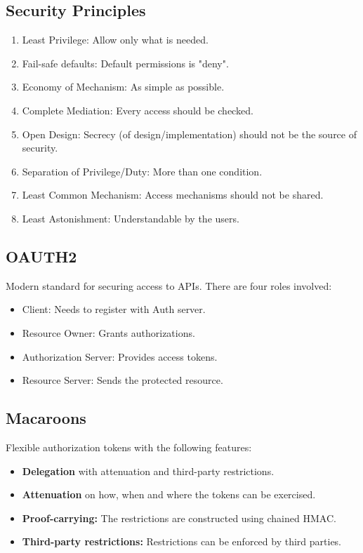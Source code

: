 \documentclass{article}
\begin{document}
\subsection{Security Principles}
\begin{enumerate}
    \item Least Privilege: Allow only what is needed.
    \item Fail-safe defaults: Default permissions is "deny".
    \item Economy of Mechanism: As simple as possible.
    \item Complete Mediation: Every access should be checked.
    \item Open Design: Secrecy (of design/implementation) should not be the source of security.
    \item Separation of Privilege/Duty: More than one condition.
    \item Least Common Mechanism: Access mechanisms should not be shared.
    \item Least Astonishment: Understandable by the users.
\end{enumerate}

\subsection{OAUTH2}
Modern standard for securing access to APIs. There are four roles involved:
\begin{itemize}
    \item Client: Needs to register with Auth server.
    \item Resource Owner: Grants authorizations.
    \item Authorization Server: Provides access tokens.
    \item Resource Server: Sends the protected resource.
\end{itemize}

\subsection{Macaroons}
Flexible authorization tokens with the following features:
\begin{itemize}
    \item \textbf{Delegation} with attenuation and third-party restrictions.
    \item \textbf{Attenuation} on how, when and where the tokens can be exercised.
    \item \textbf{Proof-carrying:} The restrictions are constructed using chained HMAC.
    \item \textbf{Third-party restrictions:} Restrictions can be enforced by third parties.
\end{itemize}
\end{document}
